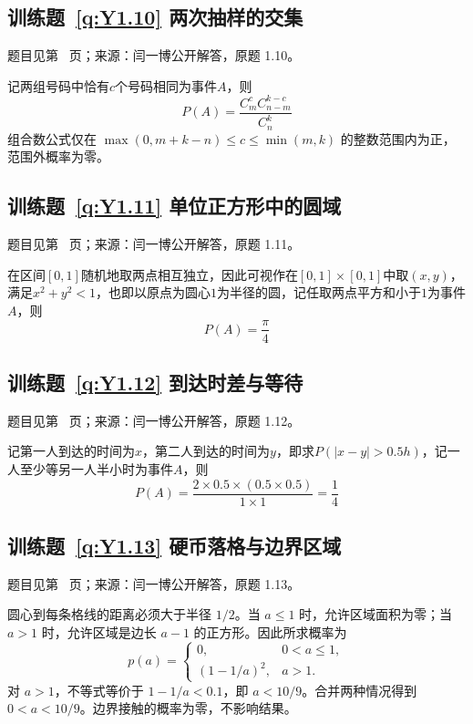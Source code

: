 \documentclass[UTF8,12pt,a4paper,fontset=fandol]{ctexbook}
\begin{document}
\subsection*{训练题~\ref{q:Y1.10} 两次抽样的交集}\label{a:Y1.10}{\small 题目见第~\pageref{q:Y1.10} 页；来源：闫一博公开解答，原题 1.10。}
\begin{solve}
记两组号码中恰有$c$个号码相同为事件$A$，则
\[P(A) = \frac{{C_m^cC_{n - m}^{k - c}}}{{C_n^k}}\]
 组合数公式仅在 $\max(0,m+k-n)\le c\le\min(m,k)$ 的整数范围内为正，范围外概率为零。\end{solve}

\subsection*{训练题~\ref{q:Y1.11} 单位正方形中的圆域}\label{a:Y1.11}{\small 题目见第~\pageref{q:Y1.11} 页；来源：闫一博公开解答，原题 1.11。}
\begin{solve}
在区间$[0,1]$随机地取两点相互独立，因此可视作在$[0,1]\times [0,1]$中取$(x,y)$，满足$x^2+y^2<1$，也即以原点为圆心$1$为半径的圆，记任取两点平方和小于$1$为事件$A$，则
\[
P(A)=\frac{\pi}{4}
\]
\end{solve}

\subsection*{训练题~\ref{q:Y1.12} 到达时差与等待}\label{a:Y1.12}{\small 题目见第~\pageref{q:Y1.12} 页；来源：闫一博公开解答，原题 1.12。}
\begin{solve}
记第一人到达的时间为$x$，第二人到达的时间为$y$，即求$P(|x-y|>0.5h)$，记一人至少等另一人半小时为事件$A$，则
\[P(A) = \frac{{2 \times 0.5 \times (0.5 \times 0.5)}}{1\times 1} = \frac{1}{4}\]
\end{solve}

\subsection*{训练题~\ref{q:Y1.13} 硬币落格与边界区域}\label{a:Y1.13}{\small 题目见第~\pageref{q:Y1.13} 页；来源：闫一博公开解答，原题 1.13。}
\begin{solve}圆心到每条格线的距离必须大于半径 $1/2$。当 $a\le1$ 时，允许区域面积为零；当 $a>1$ 时，允许区域是边长 $a-1$ 的正方形。因此所求概率为\[p(a)=\begin{cases}0,&0<a\le1,\\(1-1/a)^2,&a>1.\end{cases}\]对 $a>1$，不等式等价于 $1-1/a<0.1$，即 $a<10/9$。合并两种情况得到 $0<a<10/9$。边界接触的概率为零，不影响结果。\end{solve}
\end{document}
